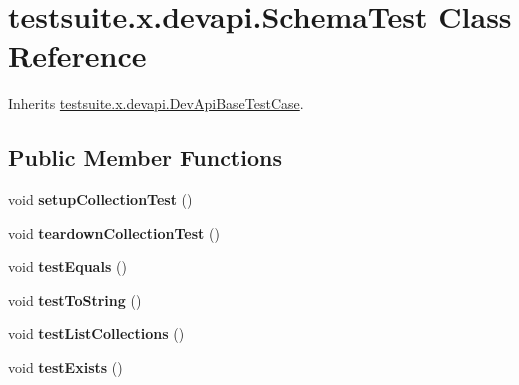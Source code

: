 \hypertarget{classtestsuite_1_1x_1_1devapi_1_1_schema_test}{}\section{testsuite.\+x.\+devapi.\+Schema\+Test Class Reference}
\label{classtestsuite_1_1x_1_1devapi_1_1_schema_test}


Inherits \mbox{\hyperlink{classtestsuite_1_1x_1_1devapi_1_1_dev_api_base_test_case}{testsuite.\+x.\+devapi.\+Dev\+Api\+Base\+Test\+Case}}.

\subsection*{Public Member Functions}
\begin{DoxyCompactItemize}
\item 
\mbox{\label{classtestsuite_1_1x_1_1devapi_1_1_schema_test_a4ab88e725bbbb39b7004c0ed785e2d5f}} 
void {\bfseries setup\+Collection\+Test} ()
\item 
\mbox{\label{classtestsuite_1_1x_1_1devapi_1_1_schema_test_a063c338ec35774e69a83e2bcb8513602}} 
void {\bfseries teardown\+Collection\+Test} ()
\item 
\mbox{\label{classtestsuite_1_1x_1_1devapi_1_1_schema_test_aa65a023bb334a1365d3d4e712bf7c831}} 
void {\bfseries test\+Equals} ()
\item 
\mbox{\label{classtestsuite_1_1x_1_1devapi_1_1_schema_test_adcae04f749b1ecf2e19bfbb1658382c1}} 
void {\bfseries test\+To\+String} ()
\item 
\mbox{\label{classtestsuite_1_1x_1_1devapi_1_1_schema_test_a3c99cd7b5b6a72880d98d6d04d67b92b}} 
void {\bfseries test\+List\+Collections} ()
\item 
\mbox{\label{classtestsuite_1_1x_1_1devapi_1_1_schema_test_a33fe571532e5c354c213fb259d7b5db3}} 
void {\bfseries test\+Exists} ()
\item 

\end{DoxyCompactItemize}
